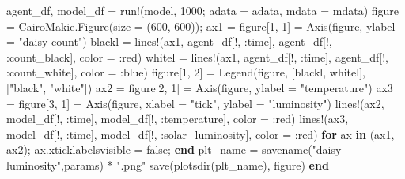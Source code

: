 \documentclass[
  english,
  russian,
  12pt,
  a4paper,
  DIV=11,
  numbers=noendperiod]{scrreprt}
\newenvironment{Shaded}{\begin{snugshade}}{\end{snugshade}}
\newcommand{\ConstantTok}[1]{\textcolor[rgb]{0.56,0.35,0.01}{#1}}
\newcommand{\ControlFlowTok}[1]{\textcolor[rgb]{0.00,0.23,0.31}{\textbf{#1}}}
\newcommand{\FloatTok}[1]{\textcolor[rgb]{0.68,0.00,0.00}{#1}}
\newcommand{\FunctionTok}[1]{\textcolor[rgb]{0.28,0.35,0.67}{#1}}
\newcommand{\KeywordTok}[1]{\textcolor[rgb]{0.00,0.23,0.31}{\textbf{#1}}}
\newcommand{\NormalTok}[1]{\textcolor[rgb]{0.00,0.23,0.31}{#1}}
\newcommand{\OperatorTok}[1]{\textcolor[rgb]{0.37,0.37,0.37}{#1}}
\newcommand{\StringTok}[1]{\textcolor[rgb]{0.13,0.47,0.30}{#1}}
\begin{document}
\begin{Shaded}
\begin{Highlighting}[]
\NormalTok{agent\_df, model\_df }\OperatorTok{=} \FunctionTok{run!}\NormalTok{(model, }\FloatTok{1000}\NormalTok{; adata }\OperatorTok{=}\NormalTok{ adata, mdata }\OperatorTok{=}\NormalTok{ mdata)}
\NormalTok{figure }\OperatorTok{=}\NormalTok{ CairoMakie.}\FunctionTok{Figure}\NormalTok{(size }\OperatorTok{=}\NormalTok{ (}\FloatTok{600}\NormalTok{, }\FloatTok{600}\NormalTok{));}
\NormalTok{ax1 }\OperatorTok{=}\NormalTok{ figure[}\FloatTok{1}\NormalTok{, }\FloatTok{1}\NormalTok{] }\OperatorTok{=} \FunctionTok{Axis}\NormalTok{(figure, ylabel }\OperatorTok{=} \StringTok{"daisy count"}\NormalTok{)}
\NormalTok{blackl }\OperatorTok{=} \FunctionTok{lines!}\NormalTok{(ax1, agent\_df[!, }\OperatorTok{:}\NormalTok{time], agent\_df[!, }\OperatorTok{:}\NormalTok{count\_black], color }\OperatorTok{=} \OperatorTok{:}\NormalTok{red)}
\NormalTok{whitel }\OperatorTok{=} \FunctionTok{lines!}\NormalTok{(ax1, agent\_df[!, }\OperatorTok{:}\NormalTok{time], agent\_df[!, }\OperatorTok{:}\NormalTok{count\_white], color }\OperatorTok{=} \OperatorTok{:}\NormalTok{blue)}
\NormalTok{figure[}\FloatTok{1}\NormalTok{, }\FloatTok{2}\NormalTok{] }\OperatorTok{=} \FunctionTok{Legend}\NormalTok{(figure, [blackl, whitel], [}\StringTok{"black"}\NormalTok{, }\StringTok{"white"}\NormalTok{])}
\NormalTok{ax2 }\OperatorTok{=}\NormalTok{ figure[}\FloatTok{2}\NormalTok{, }\FloatTok{1}\NormalTok{] }\OperatorTok{=} \FunctionTok{Axis}\NormalTok{(figure, ylabel }\OperatorTok{=} \StringTok{"temperature"}\NormalTok{)}
\NormalTok{ax3 }\OperatorTok{=}\NormalTok{ figure[}\FloatTok{3}\NormalTok{, }\FloatTok{1}\NormalTok{] }\OperatorTok{=} \FunctionTok{Axis}\NormalTok{(figure, xlabel }\OperatorTok{=} \StringTok{"tick"}\NormalTok{, ylabel }\OperatorTok{=} \StringTok{"luminosity"}\NormalTok{)}
\FunctionTok{lines!}\NormalTok{(ax2, model\_df[!, }\OperatorTok{:}\NormalTok{time], model\_df[!, }\OperatorTok{:}\NormalTok{temperature], color }\OperatorTok{=} \OperatorTok{:}\NormalTok{red)}
\FunctionTok{lines!}\NormalTok{(ax3, model\_df[!, }\OperatorTok{:}\NormalTok{time], model\_df[!, }\OperatorTok{:}\NormalTok{solar\_luminosity], color }\OperatorTok{=} \OperatorTok{:}\NormalTok{red)}
\ControlFlowTok{for}\NormalTok{ ax }\KeywordTok{in}\NormalTok{ (ax1, ax2); ax.xticklabelsvisible }\OperatorTok{=} \ConstantTok{false}\NormalTok{; }\ControlFlowTok{end}
\NormalTok{plt\_name }\OperatorTok{=} \FunctionTok{savename}\NormalTok{(}\StringTok{"daisy{-}luminosity"}\NormalTok{,params) }\OperatorTok{*} \StringTok{".png"}
\FunctionTok{save}\NormalTok{(}\FunctionTok{plotsdir}\NormalTok{(plt\_name), figure)}
\ControlFlowTok{end}
\end{Highlighting}
\end{Shaded}
\end{document}
